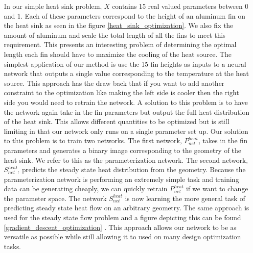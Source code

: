 \documentclass{article} %
\begin{document}
In our simple heat sink problem, $X$ contains 15 real valued parameters between 0 and 1. Each of these parameters correspond to the height of an aluminum fin on the heat sink as seen in the figure \ref{heat_sink_optimization}. We also fix the amount of aluminum and scale the total length of all the fins to meet this requirement. This presents an interesting problem of determining the optimal length each fin should have to maximize the cooling of the heat source. The simplest application of our method is use the 15 fin heights as inputs to a neural network that outputs a single value corresponding to the temperature at the heat source. This approach has the draw back that if you want to add another constraint to the optimization like making the left side is cooler then the right side you would need to retrain the network. A solution to this problem is to have the network again take in the fin parameters but output the full heat distribution of the heat sink. This allows different quantities to be optimized but is still limiting in that our network only runs on a single parameter set up. Our solution to this problem is to train two networks. The first network, $P^{heat}_{net}$, takes in the fin parameters and generates a binary image corresponding to the geometry of the heat sink. We refer to this as the parameterization network. The second network, $S^{heat}_{net}$, predicts the steady state heat distribution from the geometry. Because the parameterization network is performing an extremely simple task and training data can be generating cheaply, we can quickly retrain $P^{heat}_{net}$ if we want to change the parameter space. The network $S^{heat}_{net}$ is now learning the more general task of predicting steady state heat flow on an arbitrary geometry. The same approach is used for the steady state flow problem and a figure depicting this can be found \ref{gradient_descent_optimization} . This approach allows our network to be as versatile as possible while still allowing it to used on many design optimization tasks.
\end{document}
